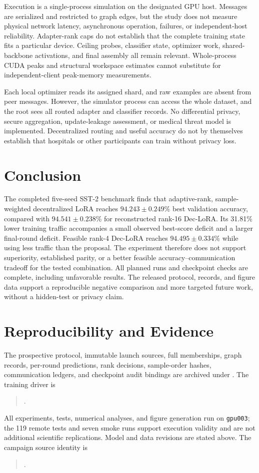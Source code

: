 \documentclass[11pt]{article}
\begin{document}
Execution is a single-process simulation on the designated GPU host. Messages are serialized and restricted to graph edges, but the study does not measure physical network latency, asynchronous operation, failures, or independent-host reliability. Adapter-rank caps do not establish that the complete training state fits a particular device. Ceiling probes, classifier state, optimizer work, shared-backbone activations, and final assembly all remain relevant. Whole-process CUDA peaks and structural workspace estimates cannot substitute for independent-client peak-memory measurements.

Each local optimizer reads its assigned shard, and raw examples are absent from peer messages. However, the simulator process can access the whole dataset, and the root sees all routed adapter and classifier records. No differential privacy, secure aggregation, update-leakage assessment, or medical threat model is implemented. Decentralized routing and useful accuracy do not by themselves establish that hospitals or other participants can train without privacy loss.

\section{Conclusion}
The completed five-seed SST-2 benchmark finds that adaptive-rank, sample-weighted decentralized LoRA reaches $94.243\pm0.249\%$ best validation accuracy, compared with $94.541\pm0.238\%$ for reconstructed rank-16 Dec-LoRA. Its 31.81\% lower training traffic accompanies a small observed best-score deficit and a larger final-round deficit. Feasible rank-4 Dec-LoRA reaches $94.495\pm0.334\%$ while using less traffic than the proposal. The experiment therefore does not support superiority, established parity, or a better feasible accuracy--communication tradeoff for the tested combination. All planned runs and checkpoint checks are complete, including unfavorable results. The released protocol, records, and figure data support a reproducible negative comparison and more targeted future work, without a hidden-test or privacy claim.

\section*{Reproducibility and Evidence}
The prospective protocol, immutable launch sources, full memberships, graph records, per-round predictions, rank decisions, sample-order hashes, communication ledgers, and checkpoint audit bindings are archived under . The training driver is
\begin{quote}\small
{}.
\end{quote}
All experiments, tests, numerical analyses, and figure generation run on \texttt{gpu003}; the 119 remote tests and seven smoke runs support execution validity and are not additional scientific replications. Model and data revisions are stated above. The campaign source identity is
\begin{quote}\small
{}.
\end{quote}
\end{document}
